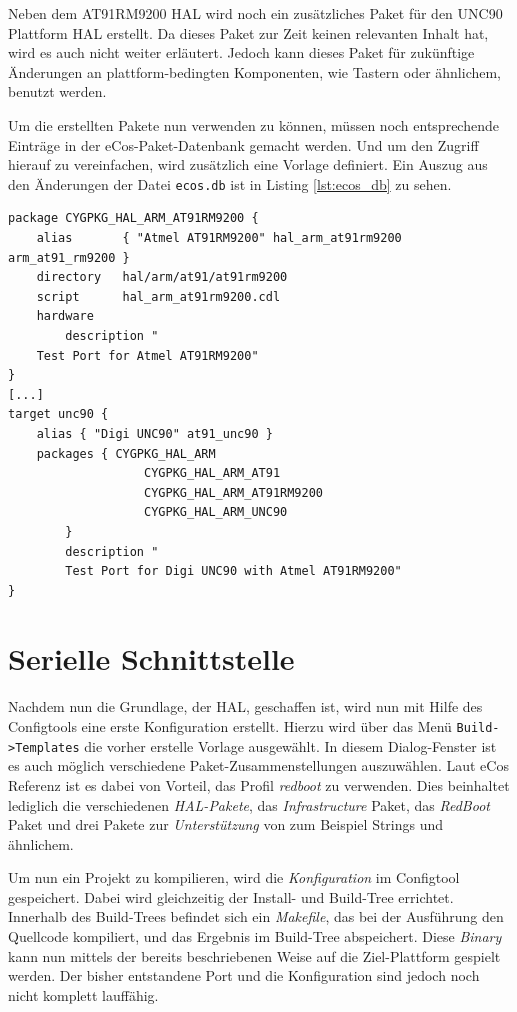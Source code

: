 \documentclass[
  a4paper,					%
  twoside,
  DIV=calc,     				%
  bibliography=totoc,
  cleardoublepage=empty,
  ngerman,     					%
  final       					%
]{scrbook}
\begin{document}
Neben dem AT91RM9200 HAL wird noch ein zusätzliches Paket für den UNC90 Plattform HAL erstellt. Da dieses Paket zur Zeit keinen relevanten Inhalt hat, wird es auch nicht weiter erläutert. Jedoch kann dieses Paket für zukünftige Änderungen an plattform-bedingten Komponenten, wie Tastern oder ähnlichem, benutzt werden.

Um die erstellten Pakete nun verwenden zu können, müssen noch entsprechende Einträge in der eCos-Paket-Datenbank gemacht werden. Und um den Zugriff hierauf zu vereinfachen, wird zusätzlich eine Vorlage definiert. Ein Auszug aus den Änderungen der Datei \texttt{ecos.db} ist in Listing \ref{lst:ecos_db} zu sehen.

\begin{lstlisting}[frame=single, float, caption={ecos.db}, label={lst:ecos_db}]
package CYGPKG_HAL_ARM_AT91RM9200 {
	alias		{ "Atmel AT91RM9200" hal_arm_at91rm9200 arm_at91_rm9200 }
	directory	hal/arm/at91/at91rm9200
	script		hal_arm_at91rm9200.cdl
	hardware
        description "
	Test Port for Atmel AT91RM9200"
}
[...]
target unc90 {
	alias { "Digi UNC90" at91_unc90 }
	packages { CYGPKG_HAL_ARM
                   CYGPKG_HAL_ARM_AT91
                   CYGPKG_HAL_ARM_AT91RM9200
                   CYGPKG_HAL_ARM_UNC90
        }
        description "
        Test Port for Digi UNC90 with Atmel AT91RM9200"
}
\end{lstlisting}





\section{Serielle Schnittstelle}
\label{sec:USART}

Nachdem nun die Grundlage, der HAL, geschaffen ist, wird nun mit Hilfe des Configtools eine erste Konfiguration erstellt. Hierzu wird über das Menü \texttt{Build->Templates} die vorher erstelle Vorlage ausgewählt. In diesem Dialog-Fenster ist es auch möglich verschiedene Paket-Zusammenstellungen auszuwählen. Laut eCos Referenz ist es dabei von Vorteil, das Profil \emph{redboot} zu verwenden. Dies beinhaltet lediglich die verschiedenen \emph{HAL-Pakete}, das \emph{Infrastructure} Paket, das \emph{RedBoot} Paket und drei Pakete zur \emph{Unterstützung} von zum Beispiel Strings und ähnlichem.

Um nun ein Projekt zu kompilieren, wird die \emph{Konfiguration} im Configtool gespeichert. Dabei wird gleichzeitig der Install- und Build-Tree errichtet. Innerhalb des Build-Trees befindet sich ein \emph{Makefile}, das bei der Ausführung den Quellcode kompiliert, und das Ergebnis im Build-Tree abspeichert. Diese \emph{Binary} kann nun mittels der bereits beschriebenen Weise auf die Ziel-Plattform gespielt werden. Der bisher entstandene Port und die Konfiguration sind jedoch noch nicht komplett lauffähig.
\end{document}
